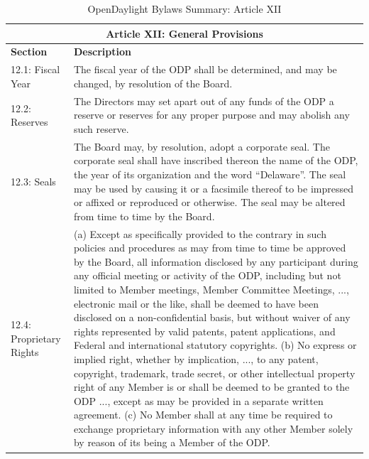 \documentclass[a4paper, 12pt]{book}
\begin{document}
\begin{table}[H]
  \begin{center}
    \begin{tabular}{ | p{4cm} | p{11cm} | }
    \toprule
    \multicolumn {2}{|c|}{\textbf{Article XII: General Provisions}} \\
    \hline
    \textbf{Section} & \textbf{Description} \\
    \hline
    12.1: Fiscal Year & The fiscal year of the ODP shall be determined, and may be changed, by resolution of the Board.\\
    \hline
    12.2: Reserves & The Directors may set apart out of any funds of the ODP a reserve or reserves for any proper purpose and may abolish any such reserve.\\
    \hline
    12.3: Seals & The Board may, by resolution, adopt a corporate seal.  The corporate seal shall have inscribed thereon the name of the ODP, the year of its organization and the word “Delaware”.  The seal may be used by causing it or a facsimile thereof to be impressed or affixed or reproduced or otherwise.  The seal may be altered from time to time by the Board.\\
    \hline
    12.4: Proprietary Rights & (a) Except as specifically provided to the contrary in such policies and procedures as may from time to time be approved by the Board, all information disclosed by any participant during any official meeting or activity of the ODP, including but not limited to Member meetings, Member Committee Meetings, ..., electronic mail or the like, shall be deemed to have been disclosed on a non-confidential basis, but without waiver of any rights represented by valid patents, patent applications, and Federal and international statutory copyrights. (b)  No express or implied right, whether by implication, ..., to any patent, copyright, trademark, trade secret, or other intellectual property right of any Member is or shall be deemed to be granted to the ODP ..., except as may be provided in a separate written agreement. (c)  No Member shall at any time be required to exchange proprietary information with any other Member solely by reason of its being a Member of the ODP.\\
    \bottomrule
    \end{tabular}
    \caption{OpenDaylight Bylaws Summary: Article XII}
    \label{tab:odlbylaws-art12}
  \end{center}
\end{table}
\end{document}
